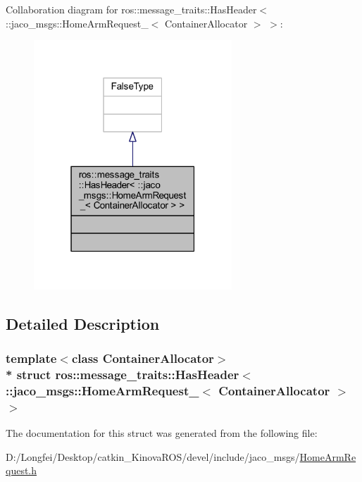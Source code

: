 Collaboration diagram for ros\+:\+:message\+\_\+traits\+:\+:Has\+Header$<$ \+:\+:jaco\+\_\+msgs\+:\+:Home\+Arm\+Request\+\_\+$<$ Container\+Allocator $>$ $>$\+:
\nopagebreak
\begin{figure}[H]
\begin{center}
\leavevmode
\includegraphics[width=211pt]{d5/dd8/structros_1_1message__traits_1_1HasHeader_3_01_1_1jaco__msgs_1_1HomeArmRequest___3_01ContainerAllocator_01_4_01_4__coll__graph}
\end{center}
\end{figure}


\subsection{Detailed Description}
\subsubsection*{template$<$class Container\+Allocator$>$\\*
struct ros\+::message\+\_\+traits\+::\+Has\+Header$<$ \+::jaco\+\_\+msgs\+::\+Home\+Arm\+Request\+\_\+$<$ Container\+Allocator $>$ $>$}



The documentation for this struct was generated from the following file\+:\begin{DoxyCompactItemize}
\item 
D\+:/\+Longfei/\+Desktop/catkin\+\_\+\+Kinova\+R\+O\+S/devel/include/jaco\+\_\+msgs/\hyperlink{HomeArmRequest_8h}{Home\+Arm\+Request.\+h}\end{DoxyCompactItemize}
